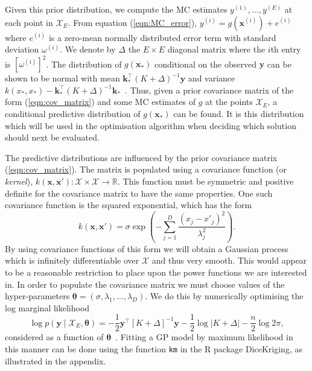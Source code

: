 \documentclass[]{sagej}
\begin{document}
Given this prior distribution, we compute the MC estimates $y^{(1)} , \ldots , y^{(E)}$ at each point in $\mathcal{X}_{E}$. From equation (\ref{eqn:MC_error}), $y^{(i)} = g(\textbf{x}^{(i)}) + e^{(i)}$ where $e^{(i)}$ is a zero-mean normally distributed error term with standard deviation $\omega^{(i)}$. We denote by $\Delta$ the $E \times E$ diagonal matrix where the $i$th entry is $[\omega^{(i)}]^{2}$. The distribution of $g(\mathbf{x}_{*})$ conditional on the observed $\mathbf{y}$ can be shown to be normal with mean $\mathbf{k}_{*}^\top(K + \Delta)^{-1}\mathbf{y}$ and variance $k(x_{*}, x_{*})-\mathbf{k}_{*}^\top(K + \Delta)^{-1}\mathbf{k}_{*}$~\cite{Rasmussen2006}. Thus, given a prior covariance matrix of the form (\ref{eqn:cov_matrix}) and some MC estimates of $g$ at the points $\mathcal{X}_{E}$, a conditional predictive distribution of $g(\mathbf{x}_{*})$ can be found. It is this distribution which will be used in the optimisation algorithm when deciding which solution should next be evaluated.

The predictive distributions are influenced by the prior covariance matrix (\ref{eqn:cov_matrix}). The matrix is populated using a covariance function (or \emph{kernel}), $k(\mathbf{x}, \mathbf{x}') : \mathcal{X} \times \mathcal{X} \rightarrow \mathbb{R}$. This function must be symmetric and positive definite for the covariance matrix to have the same properties. One such covariance function is the squared exponential, which has the form
\begin{equation}
k(\mathbf{x}, \mathbf{x}') = \sigma \exp \left( -\sum_{j=1}^{D} \frac{(x_{j} - x'_{j})^2}{\lambda_{j}^2} \right).
\end{equation}
By using covariance functions of this form we will obtain a Gaussian process which is infinitely differentiable over $\mathcal{X}$ and thus very smooth. This would appear to be a reasonable restriction to place upon the power functions we are interested in. In order to populate the covariance matrix we must choose values of the hyper-parameters $\boldsymbol{\theta} = (\sigma, \lambda_{1}, \ldots, \lambda_{D})$. We do this by numerically optimising the log marginal likelihood
\begin{equation}\label{eqn:loglik}
\log{p(\mathbf{y} \mid \mathcal{X}_{E}, \boldsymbol{\theta})} = -\frac{1}{2}\mathbf{y}^\top[K + \Delta]^{-1}\mathbf{y} - \frac{1}{2} \log{|K + \Delta|} - \frac{n}{2} \log{2\pi},
\end{equation}
considered as a function of $\boldsymbol{\theta}$~\cite{Rasmussen2006}. Fitting a GP model by maximum likelihood in this manner can be done using the function \texttt{km} in the R package DiceKriging, as illustrated in the appendix.
\end{document}
